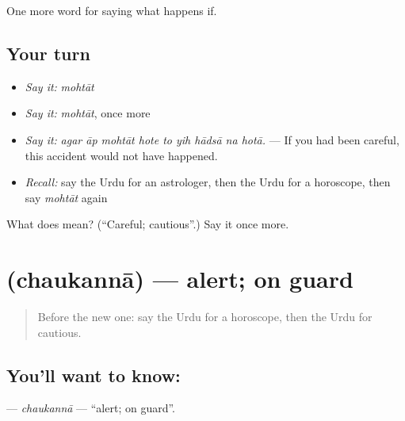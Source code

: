 \begin{grammarlens}[title={What you've built}]
One more word for saying what happens if.
\end{grammarlens}

\subsection*{Your turn}
\begin{itemize}
\raggedright
  \item \emph{Say it:} \emph{mohtāt}
  \item \emph{Say it:} \emph{mohtāt}, once more
  \item \emph{Say it:} \emph{agar āp mohtāt hote to yih hādsā na hotā.} — If you had been careful, this accident would not have happened.
  \item \emph{Recall:} say the Urdu for an astrologer, then the Urdu for a horoscope, then say \emph{mohtāt} again
\end{itemize}

\begin{tcolorbox}[breakable,colback=teal!4,colframe=teal!35!black,title={Before you move on}]
What does  mean? (\textquotedblleft{}Careful; cautious\textquotedblright{}.) Say it once more.
\end{tcolorbox}
\section[\texorpdfstring{\ur{چوکنا} (chaukannā)}{چوکنا (chaukannā)}]{ (chaukannā) — alert; on guard}

\label{lesson:UR-C536-chaukanna}



\begin{quote}
Before the new one: say the Urdu for a horoscope, then the Urdu for cautious.
\end{quote}

\subsection*{You'll want to know: }
\textbf{} — \emph{chaukannā} — \textquotedblleft{}alert; on guard\textquotedblright{}.

\begin{quote}
        
\end{quote}

